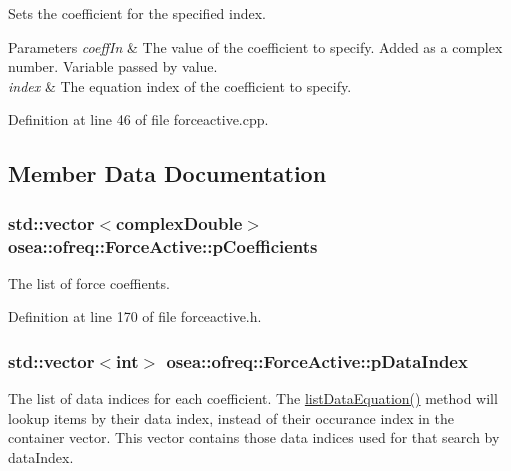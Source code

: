 Sets the coefficient for the specified index. 


\begin{DoxyParams}{Parameters}
{\em coeff\-In} & The value of the coefficient to specify. Added as a complex number. Variable passed by value. \\
\hline
{\em index} & The equation index of the coefficient to specify. \\
\hline
\end{DoxyParams}


Definition at line 46 of file forceactive.\-cpp.



\subsection{Member Data Documentation}
\hypertarget{classosea_1_1ofreq_1_1_force_active_af5731f3a699256f0b0b61b77701b236a}{
\subsubsection[{p\-Coefficients}]{\setlength{\rightskip}{0pt plus 5cm}std\-::vector$<${\bf complex\-Double}$>$ osea\-::ofreq\-::\-Force\-Active\-::p\-Coefficients\hspace{0.3cm}{\ttfamily [protected]}}}\label{classosea_1_1ofreq_1_1_force_active_af5731f3a699256f0b0b61b77701b236a}
The list of force coeffients. 

Definition at line 170 of file forceactive.\-h.

\hypertarget{classosea_1_1ofreq_1_1_force_active_a5fe90d49624efff55c2cc641f394f8f4}{
\subsubsection[{p\-Data\-Index}]{\setlength{\rightskip}{0pt plus 5cm}std\-::vector$<$int$>$ osea\-::ofreq\-::\-Force\-Active\-::p\-Data\-Index\hspace{0.3cm}{\ttfamily [protected]}}}\label{classosea_1_1ofreq_1_1_force_active_a5fe90d49624efff55c2cc641f394f8f4}


The list of data indices for each coefficient. The \hyperlink{classosea_1_1ofreq_1_1_force_active_a6c41c64d60a90442ab2caffcefe703f1}{list\-Data\-Equation()} method will lookup items by their data index, instead of their occurance index in the container vector. This vector contains those data indices used for that search by data\-Index. 



